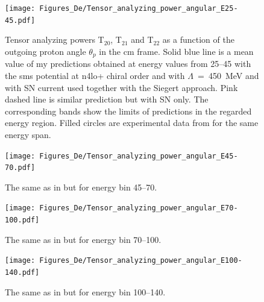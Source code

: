     \begin{figure}[h]
        \begin{center}
        \texttt{[image: Figures\_De/Tensor\_analyzing\_power\_angular\_E25-45.pdf]}
        \end{center}
        \caption{Tensor analyzing powers T$_{20}$, T$_{21}$ and T$_{22}$ as a function of the
        outgoing proton angle $\theta_p$ in the \gls{cm} frame.
        Solid blue line is a mean value of my predictions obtained 
        at energy values from \SIrange[range-phrase=\text{ to }]{25}{45}{\mev} with the
        \gls{sms} potential at \gls{n4lo+} chiral order and with $\Lambda$~=~450~MeV
         and with SN current used together with the Siegert approach. 
        Pink dashed line is similar prediction but with SN only. 
        The corresponding bands show the limits of predictions in the regarded
        energy region.
        Filled circles are experimental data
        from \cite{rachek2007} for the same energy span.}
        \label{tensor_angular_25-45}
    \end{figure}

    \begin{figure}[h]
        \begin{center}
        \texttt{[image: Figures\_De/Tensor\_analyzing\_power\_angular\_E45-70.pdf]}
        \end{center}
        \caption{The same as in  but for energy bin \SIrange{45}{70}{\mev}.}
        \label{tensor_angular_45-70}
    \end{figure}

    \begin{figure}[h]
        \begin{center}
        \texttt{[image: Figures\_De/Tensor\_analyzing\_power\_angular\_E70-100.pdf]}
        \end{center}
        \caption{The same as in  but for energy bin \SIrange{70}{100}{\mev}.}
        \label{tensor_angular_70-100}
    \end{figure}        

    \begin{figure}[h]
        \begin{center}
        \texttt{[image: Figures\_De/Tensor\_analyzing\_power\_angular\_E100-140.pdf]}
        \end{center}
        \caption{The same as in  but for energy bin \SIrange{100}{140}{\mev}.}
        \label{tensor_angular_100-140}
    \end{figure}
        
